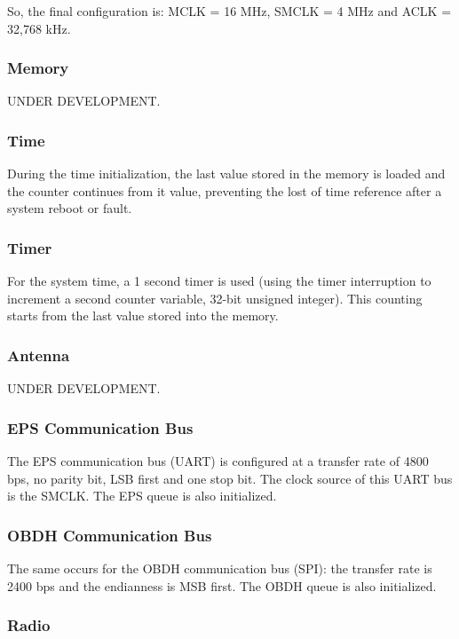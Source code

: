 \documentclass[12pt]{book}
\begin{document}
So, the final configuration is: MCLK = 16 MHz, SMCLK = 4 MHz and ACLK = 32,768 kHz.

\subsubsection{Memory}

UNDER DEVELOPMENT.

\subsubsection{Time}

During the time initialization, the last value stored in the memory is loaded and the counter continues from it value, preventing the lost of time reference after a system reboot or fault.

\subsubsection{Timer}

For the system time, a 1 second timer is used (using the timer interruption to increment a second counter variable, 32-bit unsigned integer). This counting starts from the last value stored into the memory.

\subsubsection{Antenna}

UNDER DEVELOPMENT.

\subsubsection{EPS Communication Bus}

The EPS communication bus (UART) is configured at a transfer rate of 4800 bps, no parity bit, LSB first and one stop bit. The clock source of this UART bus is the SMCLK. The EPS queue is also initialized.

\subsubsection{OBDH Communication Bus}

The same occurs for the OBDH communication bus (SPI): the transfer rate is 2400 bps and the endianness is MSB first. The OBDH queue is also initialized.

\subsubsection{Radio}
\end{document}

